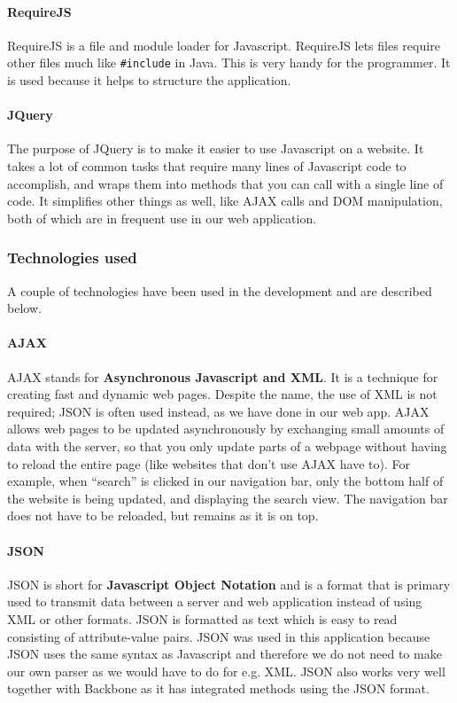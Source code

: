 \paragraph{RequireJS}
RequireJS\cite{web_5} is a file and module loader for Javascript. RequireJS lets files require other files much like \texttt{\#include} in Java. This is very handy for the programmer. It is used because it helps to structure the application.
\paragraph{JQuery}
The purpose of JQuery\cite{web_6} is to make it easier to use Javascript on a website. It takes a lot of common tasks that require many lines of Javascript code to accomplish, and wraps them into methods that you can call with a single line of code. It simplifies other things as well, like AJAX calls and DOM manipulation, both of which are in frequent use in our web application.


\subsubsection{Technologies used}
A couple of technologies have been used in the development and are described below.

\paragraph{AJAX}
AJAX\cite{web_3} stands for \textbf{Asynchronous Javascript and XML}. It is a technique for creating fast and dynamic web pages. Despite the name, the use of XML is not required; JSON is often used instead, as we have done in our web app. AJAX allows web pages to be updated asynchronously by exchanging small amounts of data with the server, so that you only update parts of a webpage without having to reload the entire page (like websites that don’t use AJAX have to). For example, when “search” is clicked in our navigation bar, only the bottom half of the website is being updated, and displaying the search view. The navigation bar does not have to be reloaded, but remains as it is on top.

\paragraph{JSON}
JSON\cite{web_4} is short for \textbf{Javascript Object Notation} and is a format that is primary used to transmit data between a server and web application instead of using XML or other formats.
JSON is formatted as text which is easy to read consisting of attribute-value pairs.
JSON was used in this application because JSON uses the same syntax as Javascript and therefore we do not need to make our own parser as we would have to do for e.g. XML. JSON also works very well together with Backbone as it has integrated methods using the JSON format.

